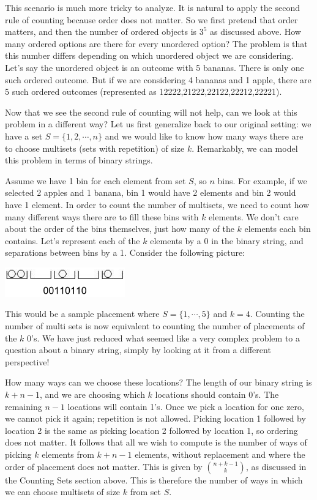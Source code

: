 \documentclass[11pt,fleqn]{article}
\begin{document}
This scenario is much more tricky to analyze. It is natural to apply the second rule of counting
because order does not matter. So we first pretend that order matters, and then the number of 
ordered objects is $3^5$ as discussed above. How many ordered options are there
for every unordered option? The problem is that this number differs depending on which
unordered object we are considering. Let's say the unordered object is an
outcome with 5 bananas. There is only one such ordered outcome. But if we are considering
4 bananas and 1 apple, there are 5 such ordered outcomes (represented as 12222,21222,22122,22212,22221). 

Now that we see the second rule of counting will not help, can we look at this problem
in a different way? Let us first generalize back to our original setting: we have a set $S = \{1,2,\cdots,n\}$ and we would like to know
how many ways there are to choose multisets (sets with repetition)
of size $k$.  Remarkably, we can model this problem in terms of binary strings.

Assume we have 1 bin for each element from set $S$, so $n$ bins. For example,
if we selected 2 apples and 1 banana, bin 1 would have 2 elements
and bin 2 would have 1 element.  In order to 
count the number of multisets, we need to count how many different ways there
are to fill these bins with $k$ elements. We don't care about the order of the bins themselves,
just how many of the $k$ elements each bin contains. Let's represent each of the $k$
elements by a 0 in the binary string, and separations between bins by a 1. Consider
the following picture: 

\begin{center}
\includegraphics[scale=.8]{bin4.png}
\end{center}

This would be a sample placement where $S = \{1,\cdots,5\}$ and $k = 4$. 
Counting the number of multi sets
is now equivalent to counting the number of 
placements of the
$k$ 0's. 
We have just reduced what seemed like a very complex problem to
a question about a binary string, simply by looking at it from a different perspective!  

How many ways can we choose these locations? The length
of our binary string is $k + n - 1$, and we are choosing which $k$ locations
should contain 0's. The remaining $n-1$ locations will contain 1's.
Once we pick a location for one zero, we cannot pick it again; repetition
is not allowed. Picking location 1 followed by location 
2 is the same as picking location 2 followed by location 1, so ordering does not matter.
It follows that all we wish to compute is the number of ways of picking $k$ elements from $k + n - 1$ elements, without
replacement and where the order of placement does not matter. This is given by $n + k - 1\choose k$,
as discussed in the Counting Sets section above. This is therefore the number of ways
in which we can choose multisets of size $k$ from set $S$. 
\end{document}
